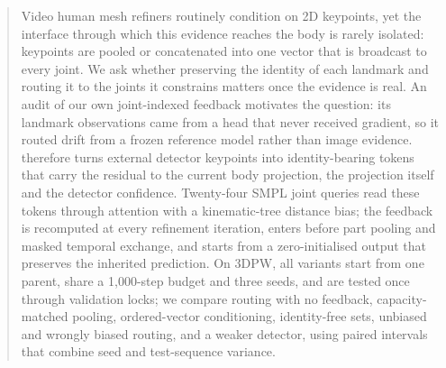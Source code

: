 \begin{abstract}
Video human mesh refiners routinely condition on 2D keypoints, yet the interface through which this evidence reaches the body is rarely isolated: keypoints are pooled or concatenated into one vector that is broadcast to every joint.
We ask whether preserving the identity of each landmark and routing it to the joints it constrains matters once the evidence is real.
An audit of our own joint-indexed feedback motivates the question: its landmark observations came from a head that never received gradient, so it routed drift from a frozen reference model rather than image evidence.
\method therefore turns external detector keypoints into identity-bearing tokens that carry the residual to the current body projection, the projection itself and the detector confidence.
Twenty-four SMPL joint queries read these tokens through attention with a kinematic-tree distance bias; the feedback is recomputed at every refinement iteration, enters before part pooling and masked temporal exchange, and starts from a zero-initialised output that preserves the inherited prediction.
On 3DPW, all variants start from one parent, share a 1,000-step budget and three seeds, and are tested once through validation locks; we compare routing with no feedback, capacity-matched pooling, ordered-vector conditioning, identity-free sets, unbiased and wrongly biased routing, and a weaker detector, using paired intervals that combine seed and test-sequence variance.
\end{abstract}
